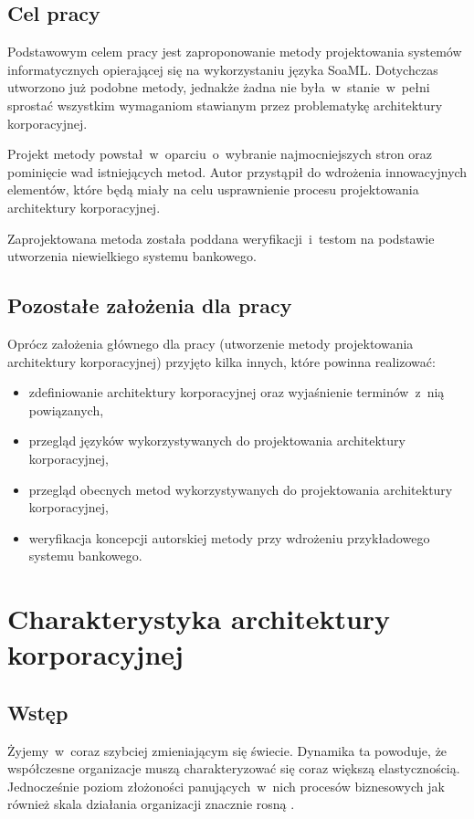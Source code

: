 \section{Cel pracy}
Podstawowym celem pracy jest zaproponowanie metody projektowania systemów informatycznych opierającej się na wykorzystaniu języka SoaML. Dotychczas utworzono już podobne metody, jednakże żadna nie była~w~stanie~w~pełni sprostać wszystkim wymaganiom stawianym przez problematykę architektury korporacyjnej.

Projekt metody powstał~w~oparciu~o~wybranie najmocniejszych stron oraz pominięcie wad istniejących metod. Autor przystąpił do wdrożenia innowacyjnych elementów, które będą miały na celu usprawnienie procesu projektowania architektury korporacyjnej.

Zaprojektowana metoda została poddana weryfikacji~i~testom na podstawie utworzenia niewielkiego systemu bankowego.

\section{Pozostałe założenia dla pracy}
Oprócz założenia głównego dla pracy (utworzenie metody projektowania architektury korporacyjnej) przyjęto kilka innych, które powinna realizować:
\begin{itemize}
\item{zdefiniowanie architektury korporacyjnej oraz wyjaśnienie terminów~z~nią powiązanych,}
\item{przegląd języków wykorzystywanych do projektowania architektury korporacyjnej,}
\item{przegląd obecnych metod wykorzystywanych do projektowania architektury korporacyjnej,}
\item{weryfikacja koncepcji autorskiej metody przy wdrożeniu przykładowego systemu bankowego.}
\end{itemize}

\chapter{Charakterystyka architektury korporacyjnej}

\section{Wstęp}
Żyjemy~w~coraz szybciej zmieniającym się świecie. Dynamika ta powoduje, że współczesne organizacje muszą charakteryzować się coraz większą elastycznością. Jednocześnie poziom złożoności panujących~w~nich procesów biznesowych jak również skala działania organizacji znacznie rosną \cite{SobArchKorpDobrPr}.

